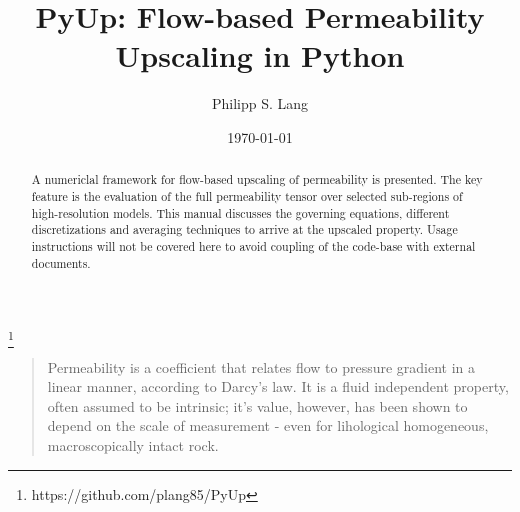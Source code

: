 \documentclass[%
 aip,
 jmp,%
 amsmath,amssymb,
 reprint,%
]{revtex4-1}
\begin{document}

\title[Flow-based Upscaling]{PyUp: Flow-based Permeability Upscaling in Python}%
\thanks{https://github.com/plang85/PyUp}

\author{Philipp S. Lang}
%



\date{\today}%

\begin{abstract}
A numericlal framework for flow-based upscaling of permeability is presented. The key feature is the evaluation of the full permeability tensor over selected sub-regions of high-resolution models. This manual discusses the governing equations, different discretizations and averaging techniques to arrive at the upscaled property. Usage instructions will not be covered here to avoid coupling of the code-base with external documents.

%
\end{abstract}

\maketitle

\begin{quotation}
Permeability is a coefficient that relates flow to pressure gradient in a linear manner, according to Darcy's law. It is a fluid independent property, often assumed to be intrinsic; it's value, however, has been shown to depend on the scale of measurement - even for lihological homogeneous, macroscopically intact rock. 
\end{quotation}
\end{document}
